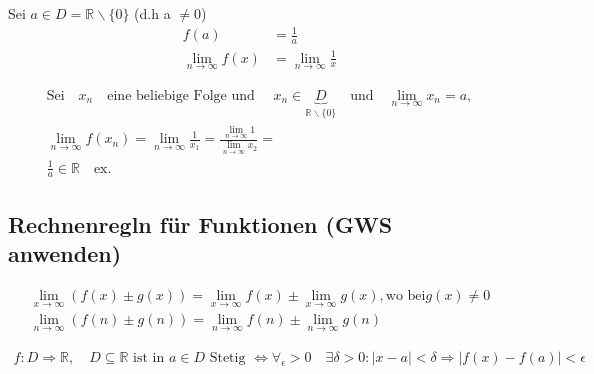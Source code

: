 \begin{beweis}
Sei $ a \in D = \mathbb{R} \backslash \{0 \}$ (d.h a $\neq 0$) 
\begin{align*}
f(a)  &= \frac{1}{a} \tag{1} \\ 
\lim_{n \to \infty}{f(x)}  &=
\lim_{n \to \infty}{\frac{1}{x}} \tag{2}
\end{align*} 

\begin{gather*}
\text{Sei} \quad x_n \quad \text{eine beliebige Folge und }\quad x_n \in \underbrace{D}_{\mathbb{R}\backslash \{ 0 \}}  \quad \text{und}\quad 
  \lim_{n \to \infty}{x_n}=a , \\
  \lim_{n \to \infty}{f(x_n)} =  \lim_{n \to \infty}{\frac{1}{x_1}} = 
  \frac{\lim\limits_{n \rightarrow \infty}{1}}{\lim\limits_{n \rightarrow \infty}{x_2}} = \\ 
\frac{1}{a} \in \mathbb{R} \quad \text{ex.}
\end{gather*}
\end{beweis}  
\subsection{Rechnenregln für Funktionen (GWS anwenden)}
\begin{gather*} 
\lim\limits_{x \rightarrow \infty}{(f(x) \pm g(x))} =\lim\limits_{x \rightarrow \infty}{f(x)} \pm  \lim\limits_{x \rightarrow \infty}{g(x)} , \text{wo bei} g(x)\neq 0  \\
\lim\limits_{n \rightarrow \infty}{(f(n) \pm g(n))} =\lim\limits_{n \rightarrow \infty}{f(n)} \pm  \lim\limits_{n \rightarrow \infty}{g(n)} 
\end{gather*}

\begin{theorem}
\begin{gather}
f: D \Rightarrow \mathbb{R} , \quad D \subseteq \mathbb{R} \text{ ist in } a \in D \text{ Stetig }
\Leftrightarrow \forall_{\epsilon} > 0 \quad \exists \delta > 0 : |x-a| < \delta \Rightarrow |f(x)- f(a)|< \epsilon 
\end{gather} 
\end{theorem}
  

 